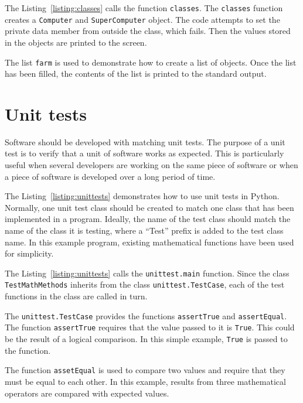 \documentclass[11pt,a4paper]{article}
\begin{document}


The Listing~\ref{listing:classes} calls the function \texttt{classes}.  The \texttt{classes} function creates a \texttt{Computer} and \texttt{SuperComputer} object.  The code attempts to set the private data member from outside the class, which fails.  Then the values stored in the objects are printed to the screen.

The list \texttt{farm} is used to demonstrate how to create a list of objects.  Once the list has been filled, the contents of the list is printed to the standard output.     

\section{Unit tests}

Software should be developed with matching unit tests.  The purpose of a unit test is to verify that a unit of software works as expected.  This is particularly useful when several developers are working on the same piece of software or when a piece of software is developed over a long period of time.

The Listing~\ref{listing:unittests} demonstrates how to use unit tests in Python.  Normally, one unit test class should be created to match one class that has been implemented in a program.  Ideally, the name of the test class should match the name of the class it is testing, where a ``Test'' prefix is added to the test class name.  In this example program, existing mathematical functions have been used for simplicity.



The Listing~\ref{listing:unittests} calls the \texttt{unittest.main} function.  Since the class \texttt{TestMathMethods} inherits from the class \texttt{unittest.TestCase}, each of the test functions in the class are called in turn.

The \texttt{unittest.TestCase} provides the functions \texttt{assertTrue} and \texttt{assertEqual}.  The function \texttt{assertTrue} requires that the value passed to it is \texttt{True}.  This could be the result of a logical comparison.  In this simple example, \texttt{True} is passed to the function.

The function \texttt{assetEqual} is used to compare two values and require that they must be equal to each other.  In this example, results from three mathematical operators are compared with expected values. 
\end{document}

